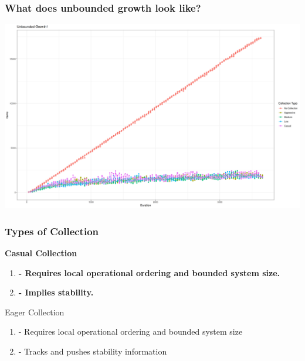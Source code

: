 \documentclass{beamer}
\begin{document}
    \begin{frame}[shrink]
        \frametitle{What does unbounded growth look like?}
        \includegraphics[width=\textwidth]{Unbounded}
    \end{frame}

    \begin{frame}
        \frametitle{Types of Collection}

        \textbf{Casual Collection}
        \begin{enumerate}
            \item \textbf{- Requires local operational ordering and bounded
                system size.}
            \item \textbf{- Implies stability.}
        \end{enumerate}

        Eager Collection
        \begin{enumerate}
            \item - Requires local operational ordering and bounded
                system size
            \item - Tracks and pushes stability information
        \end{enumerate}
    \end{frame}
\end{document}
